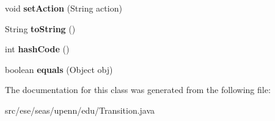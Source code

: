 \begin{DoxyCompactItemize}
\item 
\hypertarget{classese_1_1seas_1_1upenn_1_1edu_1_1_transition_aaa5a6e03b91e1a64bc5060e64ef49e5d}{}void {\bfseries set\+Action} (String action)\label{classese_1_1seas_1_1upenn_1_1edu_1_1_transition_aaa5a6e03b91e1a64bc5060e64ef49e5d}

\item 
\hypertarget{classese_1_1seas_1_1upenn_1_1edu_1_1_transition_ae9e57256dc34d80b35316193f3d4807a}{}String {\bfseries to\+String} ()\label{classese_1_1seas_1_1upenn_1_1edu_1_1_transition_ae9e57256dc34d80b35316193f3d4807a}

\item 
\hypertarget{classese_1_1seas_1_1upenn_1_1edu_1_1_transition_a6ef52b94cb2f06593fff3144d9db61fb}{}int {\bfseries hash\+Code} ()\label{classese_1_1seas_1_1upenn_1_1edu_1_1_transition_a6ef52b94cb2f06593fff3144d9db61fb}

\item 
\hypertarget{classese_1_1seas_1_1upenn_1_1edu_1_1_transition_a704a4dd99037e7a33b79d1d785210d67}{}boolean {\bfseries equals} (Object obj)\label{classese_1_1seas_1_1upenn_1_1edu_1_1_transition_a704a4dd99037e7a33b79d1d785210d67}

\end{DoxyCompactItemize}


The documentation for this class was generated from the following file\+:\begin{DoxyCompactItemize}
\item 
src/ese/seas/upenn/edu/Transition.\+java\end{DoxyCompactItemize}
